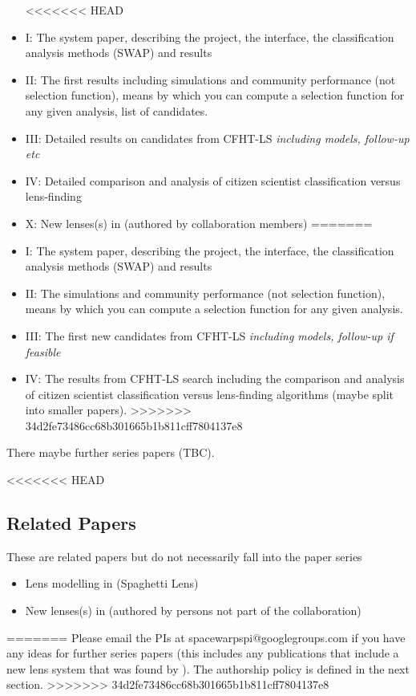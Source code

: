\documentclass[a4paper]{article}
\begin{document}
\begin{itemize}
<<<<<<< HEAD
\item \sw I: The system paper, describing the project, the interface, the classification analysis methods (SWAP) and results 
\item \sw II: The \sw  first results including simulations and community performance (not selection function), means by which you can compute a selection function for any given analysis, list of candidates. 
\item \sw III: Detailed results on candidates from CFHT-LS \textit{including models, follow-up etc}
\item \sw IV: Detailed comparison and analysis of citizen scientist classification versus lens-finding
\item \sw X: New lenses(s) in \sw (authored by collaboration members)
=======
\item \sw I: The system paper, describing the project, the interface, the
classification analysis methods (SWAP) and results 
\item \sw II: The \sw  simulations and community performance (not selection
function), means by which you can compute a selection function for any given
analysis. 
\item \sw III: The first new candidates from CFHT-LS \textit{including models,
follow-up if feasible}
\item \sw IV: The results from CFHT-LS search including the comparison and
analysis of citizen scientist classification versus lens-finding algorithms
(maybe split into smaller papers).
>>>>>>> 34d2fe73486cc68b301665b1b811cff7804137e8
\end{itemize}

There maybe further series papers (TBC).\newline

<<<<<<< HEAD
\subsection{\sw Related Papers}
These are \sw related papers but do not necessarily fall into the \sw paper series
\begin{itemize}
\item Lens modelling in \sw (Spaghetti Lens)
\item New lenses(s) in \sw (authored by persons not part of the \sw collaboration)
\end{itemize}

=======
Please email the \sw PIs at spacewarpspi@googlegroups.com if you have any
ideas for further \sw series papers (this includes any publications that
include a new lens system that was found by \sw). The authorship policy is
defined in the next section.
>>>>>>> 34d2fe73486cc68b301665b1b811cff7804137e8
\end{document}
